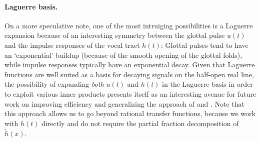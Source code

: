 \begin{chapterappendices}{5}
\paragraph{Laguerre basis.}
On a more speculative note, one of the most intruiging possibilities is a Laguerre expansion because of an interesting symmetry between the glottal pulse $u(t)$ and the impulse responses of the vocal tract $h(t)$:
Glottal pulses tend to have an `exponential' buildup (because of the smooth opening of the glottal folds), while impulse responses typically have an exponential decay.
Given that Laguerre functions are well suited as a basis for decaying signals on the half-open real line, the possibility of expanding \emph{both} $u(t)$ and $h(t)$ in the Laguerre basis in order to exploit various inner products presents itself as an interesting avenue for future work on improving efficiency and generalizing the approach of \cite{Guarnizo2018} and \cite{Tobar2015}.
Note that this approach allows us to go beyond rational transfer functions, because we work with $h(t)$ directly and do not require the partial fraction decomposition of $\tilde{h}(x)$.

\end{chapterappendices}
